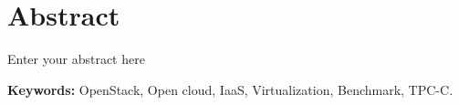 \documentclass[a4paper, 12pt, oneside, titlepage]{scrbook}
\begin{document}

\tableofcontents
\listoffigures
\listoftables
\doublespacing



\chapter*{Abstract}
Enter your abstract here

{\bf Keywords:} OpenStack, Open cloud, IaaS, Virtualization, Benchmark, TPC-C.






























% 
% 

















\end{document}
